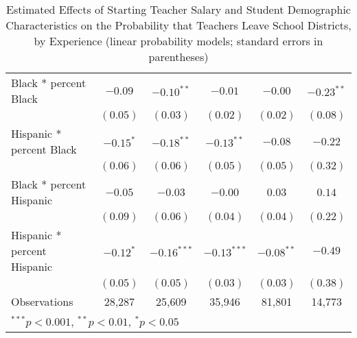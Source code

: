 \documentclass[]{article}
\begin{document}
\begin{table}
\begin{center}
\begin{tabular}{l c c c c c }
\quad Black * percent Black                 & $-0.09$      & $-0.10^{**}$  & $-0.01$       & $-0.00$      & $-0.23^{**}$ \\
                                            & $(0.05)$     & $(0.03)$      & $(0.02)$      & $(0.02)$     & $(0.08)$     \\
\quad Hispanic * percent Black              & $-0.15^{*}$  & $-0.18^{**}$  & $-0.13^{**}$  & $-0.08$      & $-0.22$      \\
                                            & $(0.06)$     & $(0.06)$      & $(0.05)$      & $(0.05)$     & $(0.32)$     \\
\quad Black * percent Hispanic              & $-0.05$      & $-0.03$       & $-0.00$       & $0.03$       & $0.14$       \\
                                            & $(0.09)$     & $(0.06)$      & $(0.04)$      & $(0.04)$     & $(0.22)$     \\
\quad Hispanic * percent Hispanic           & $-0.12^{*}$  & $-0.16^{***}$ & $-0.13^{***}$ & $-0.08^{**}$ & $-0.49$      \\
                                            & $(0.05)$     & $(0.05)$      & $(0.03)$      & $(0.03)$     & $(0.38)$     \\
\hline
Observations                                & 28,287        & 25,609         & 35,946         & 81,801        & 14,773        \\
\hline
\multicolumn{6}{l}{\scriptsize{$^{***}p<0.001$, $^{**}p<0.01$, $^*p<0.05$}}
\end{tabular}
\caption{Estimated Effects of Starting Teacher Salary and Student Demographic Characteristics on the Probability that Teachers Leave School Districts, by Experience (linear probability models; standard errors in parentheses)}
\label{tbl:reg_lpm}
\end{center}
\end{table}
\end{document}
